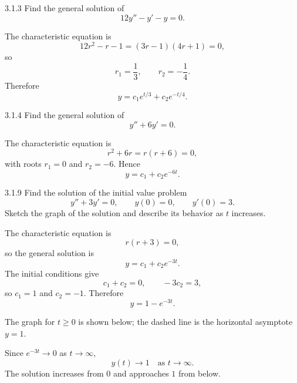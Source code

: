 \documentclass[11pt,oneside]{article}
\begin{document}
\begin{problem}{3.1.3}
Find the general solution of
\[
    12y''-y'-y=0.
\]
\end{problem}

\begin{solution}
The characteristic equation is
\[
    12r^2-r-1=(3r-1)(4r+1)=0,
\]
so
\[
    r_1=\frac13,
    \qquad
    r_2=-\frac14.
\]
Therefore
\[
    \boxed{y=c_1e^{t/3}+c_2e^{-t/4}}.
\]
\end{solution}

\begin{problem}{3.1.4}
Find the general solution of
\[
    y''+6y'=0.
\]
\end{problem}

\begin{solution}
The characteristic equation is
\[
    r^2+6r=r(r+6)=0,
\]
with roots $r_1=0$ and $r_2=-6$. Hence
\[
    \boxed{y=c_1+c_2e^{-6t}}.
\]
\end{solution}

\begin{problem}{3.1.9}
Find the solution of the initial value problem
\[
    y''+3y'=0,
    \qquad
    y(0)=0,
    \qquad
    y'(0)=3.
\]
Sketch the graph of the solution and describe its behavior as $t$ increases.
\end{problem}

\begin{solution}
The characteristic equation is
\[
    r(r+3)=0,
\]
so the general solution is
\[
    y=c_1+c_2e^{-3t}.
\]
The initial conditions give
\[
    c_1+c_2=0,
    \qquad
    -3c_2=3,
\]
so $c_1=1$ and $c_2=-1$. Therefore
\[
    \boxed{y=1-e^{-3t}}.
\]

The graph for $t\geq0$ is shown below; the dashed line is the horizontal asymptote $y=1$.

\begin{center}
\end{center}

Since $e^{-3t}\to0$ as $t\to\infty$,
\[
    \boxed{y(t)\to1\quad\text{as }t\to\infty}.
\]
The solution increases from $0$ and approaches $1$ from below.
\end{solution}
\end{document}

